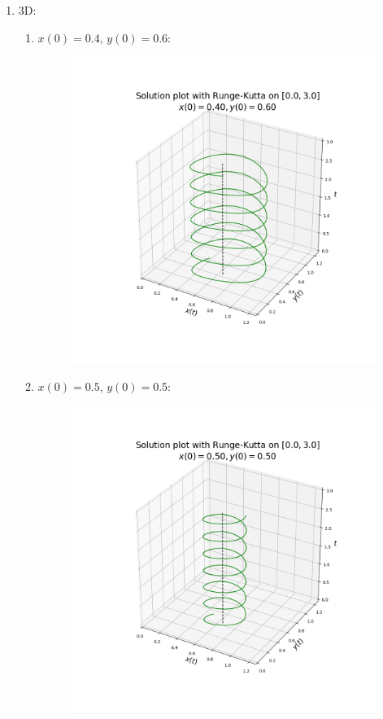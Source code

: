 \begin{enumerate}
\begin{enumerate}
\begin{figure}
		\end{figure}
	\end{enumerate}
	\item 3D:
	\begin{enumerate}
		\item $x(0) = 0.4$, $y(0) = 0.6$:
		\begin{figure}
			\centering
			\includegraphics[width=\textwidth]{plot_3d_0.40_0.60.png}
		\end{figure}
		\item $x(0) = 0.5$, $y(0) = 0.5$:
		\begin{figure}
			\centering
			\includegraphics[width=\textwidth]{plot_3d_0.50_0.50.png}

\end{figure}
\end{enumerate}
\end{enumerate}
